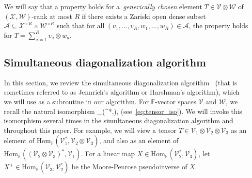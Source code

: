 \documentclass[11pt]{article}
\theoremstyle{definition}
\newcommand{\im}{\operatorname{im}}
\newcommand{\setft}[1]{\mathrm{#1}}
\newcommand{\field}{\mathbb{F}}
\newcommand\X{\mathcal{X}}
\newcommand\W{\mathcal{W}}
\newcommand\A{\mathcal{A}}
\newcommand\V{\mathcal{V}}
\def\ba#1\ea{\begin{align}#1\end{align}}
\begin{document}

%
%

We will say that a property holds for a~\textit{generically chosen} element $T \in \V \otimes \W$ of $(\X,\W)$-rank at most $R$ if there exists a Zariski open dense subset $\A\subseteq \X^{\times R}\times \W^{\times R}$ such that for all $(v_1,\dots, v_R, w_1,\dots, w_R)\in \A$, the property holds for $T=\sum_{a=1}^R v_a \otimes w_a$.


\subsection{Simultaneous diagonalization algorithm}\label{sec:jennrich}

In this section, we review the simultaneous diagonalization algorithm~\cite{Har72} (that is sometimes referred to as Jennrich's algorithm or Harshman's algorithm), which we will use as a subroutine in our algorithm. For $\field$-vector spaces $\V$ and $\W$, we recall the natural isomorphism
\ba
\V \otimes \W \cong \setft{Hom}_{\field}(\W^*,\V),
\ea
(see~\eqref{eq:tensor_iso}). We will invoke this isomorphism several times in the simultaneous diagonalization algorithm and throughout this paper. For example, we will view a tensor $T \in \V_1 \otimes \V_2\otimes \V_3$ as an element of $\setft{Hom}_{\field}(\V_1^*, \V_2\otimes \V_3)$, and also as an element of $\setft{Hom}_{\field}((\V_2 \otimes \V_3)^*,\V_1).$ For a linear map $X \in \setft{Hom}_{\field}(\V_2^*,\V_3)$, let $X^+ \in \setft{Hom}_{\field}(\V_3,\V_2^*)$ be the Moore-Penrose pseudoinverse of $X$. %
\end{document}
